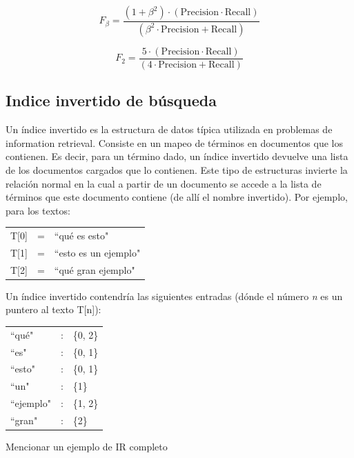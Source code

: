 \begin{equation}\label{eq:fb}
  F_\beta = \frac{(1 + \beta^2) \cdot (\mathrm{Precision} \cdot \mathrm{Recall})}{(\beta^2 \cdot \mathrm{Precision} + \mathrm{Recall})}
\end{equation}


\begin{equation}\label{eq:f2}
  F_2 = \frac{5 \cdot (\mathrm{Precision} \cdot \mathrm{Recall})}{(4 \cdot \mathrm{Precision} + \mathrm{Recall})}
\end{equation}


\subsection{Indice invertido de búsqueda}
\label{subsec:indice-invertido}
Un índice invertido es la estructura de datos típica utilizada en problemas de information retrieval. Consiste en un mapeo de términos en documentos que los contienen. Es decir, para un término dado, un índice invertido devuelve una lista de los documentos cargados que lo contienen. Este tipo de estructuras invierte la relación normal en la cual a partir de un documento se accede a la lista de términos que este documento contiene (de allí el nombre invertido).
Por ejemplo, para los textos:
\medskip

\begin{tabular}{lll}
T[0] & = & ``qué es esto" \\
T[1] & = & ``esto es un ejemplo" \\
T[2] & = & ``qué gran ejemplo" \\
\end{tabular}
\medskip

Un índice invertido contendría las siguientes entradas (dónde el número \textit{n} es un puntero al texto T[n]):
\medskip %

\begin{tabular}{lll}
	``qué" & : & \{0, 2\}\\
	``es" &:& \{0, 1\}\\
	``esto" & :& \{0, 1\} \\
	``un" & :&   \{1\} \\
	``ejemplo" & :& \{1, 2\} \\
	``gran" & :& \{2\} \\
\end{tabular}
\medskip
{\color{red} Mencionar un ejemplo de IR completo}

